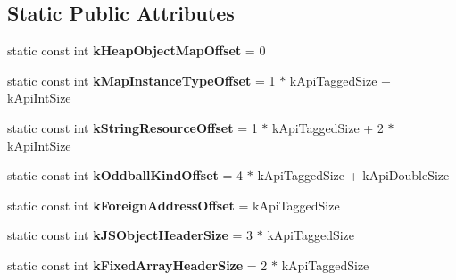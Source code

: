 \subsection*{Static Public Attributes}
\begin{DoxyCompactItemize}
\item 
\mbox{\label{classv8_1_1internal_1_1Internals_a0902a596b5656b4592157eaacc020512}} 
static const int {\bfseries k\+Heap\+Object\+Map\+Offset} = 0
\item 
\mbox{\label{classv8_1_1internal_1_1Internals_a39ea290dfaa9de300bd79aa73a874a88}} 
static const int {\bfseries k\+Map\+Instance\+Type\+Offset} = 1 $\ast$ k\+Api\+Tagged\+Size + k\+Api\+Int\+Size
\item 
\mbox{\label{classv8_1_1internal_1_1Internals_a8c2b35069864f567ca0c571310dd90a1}} 
static const int {\bfseries k\+String\+Resource\+Offset} = 1 $\ast$ k\+Api\+Tagged\+Size + 2 $\ast$ k\+Api\+Int\+Size
\item 
\mbox{\label{classv8_1_1internal_1_1Internals_a98685d6861a07139720cd296f94f2b73}} 
static const int {\bfseries k\+Oddball\+Kind\+Offset} = 4 $\ast$ k\+Api\+Tagged\+Size + k\+Api\+Double\+Size
\item 
\mbox{\label{classv8_1_1internal_1_1Internals_ad4134449ee39b95e5ac035996aa7d66b}} 
static const int {\bfseries k\+Foreign\+Address\+Offset} = k\+Api\+Tagged\+Size
\item 
\mbox{\label{classv8_1_1internal_1_1Internals_af8faf3ff3271d26bafa6ca0ea87e2a57}} 
static const int {\bfseries k\+J\+S\+Object\+Header\+Size} = 3 $\ast$ k\+Api\+Tagged\+Size
\item 
\mbox{\label{classv8_1_1internal_1_1Internals_a715ca62a5ddceac28d43c470db067675}} 
static const int {\bfseries k\+Fixed\+Array\+Header\+Size} = 2 $\ast$ k\+Api\+Tagged\+Size
\item 
\mbox{\label{classv8_1_1internal_1_1Internals_a080e5babff09ca38831e9b887233c432}} 

\end{DoxyCompactItemize}
